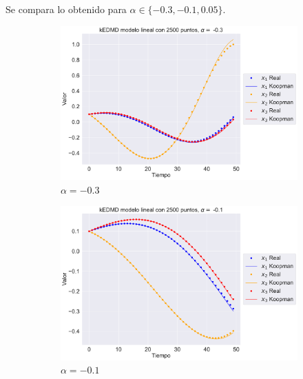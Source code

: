 Se compara lo obtenido para $\alpha \in \{ -0.3, -0.1, 0.05\}$.
\begin{figure}[htbp]
    \centering
    \begin{subfigure}[b]{0.32\textwidth}
        \centering
        \includegraphics[width=\textwidth]{img/content/chapter3/Linear1.pdf}
        \caption{$\alpha=-0.3$}
        \label{fig:Linear1}
    \end{subfigure}
    \hfill
    \begin{subfigure}[b]{0.32\textwidth}
        \centering
        \includegraphics[width=\textwidth]{img/content/chapter3/Linear2.pdf}
        \caption{$\alpha=-0.1$}
        \label{fig:Linear2}
    \end{subfigure}
    \hfill
    \begin{subfigure}[b]{0.32\textwidth}
        \centering

\end{subfigure}
\end{figure}
